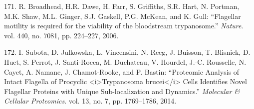 \documentclass[12pt,twoside]{reedthesis}
\theoremstyle{definition}
\theoremstyle{definition}
\theoremstyle{remark}
\begin{document}
  \hypertarget{ref-Broadhead2006}{}
  171. R. Broadhead, H.R. Dawe, H. Farr, S. Griffiths, S.R. Hart, N.
  Portman, M.K. Shaw, M.L. Ginger, S.J. Gaskell, P.G. McKean, and K. Gull:
  ``Flagellar motility is required for the viability of the bloodstream
  trypanosome.'' \emph{Nature}. vol. 440, no. 7081, pp. 224--227, 2006.
  
  \hypertarget{ref-Subota2014}{}
  172. I. Subota, D. Julkowska, L. Vincensini, N. Reeg, J. Buisson, T.
  Blisnick, D. Huet, S. Perrot, J. Santi-Rocca, M. Duchateau, V. Hourdel,
  J.-C. Rousselle, N. Cayet, A. Namane, J. Chamot-Rooke, and P. Bastin:
  ``Proteomic Analysis of Intact Flagella of Procyclic
  \textless{}i\textgreater{}Trypanosoma brucei\textless{}/i\textgreater{}
  Cells Identifies Novel Flagellar Proteins with Unique Sub-localization
  and Dynamics.'' \emph{Molecular \& Cellular Proteomics}. vol. 13, no. 7,
  pp. 1769--1786, 2014.


\end{document}
